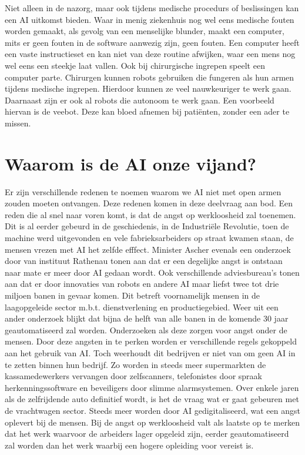 \documentclass{article}
\begin{document}
Niet alleen in de nazorg, maar ook tijdens medische procedurs of beslissingen kan een AI uitkomst bieden. Waar in menig ziekenhuis
nog wel eens medische fouten worden gemaakt, als gevolg van een menselijke blunder, maakt een computer, mits er geen fouten in de software
aanwezig zijn, geen fouten.\cite{computerziekenhuis} Een computer heeft een vaste instructieset en kan niet van deze routine afwijken, waar
een mens nog wel eens een steekje laat vallen. Ook bij chirurgische ingrepen speelt een computer parte.\cite{medischerobots} Chirurgen kunnen
robots gebruiken die fungeren als hun armen tijdens medische ingrepen. Hierdoor kunnen ze veel nauwkeuriger te werk gaan. Daarnaast zijn er
ook al robots die autonoom te werk gaan. Een voorbeeld hiervan is de veebot. Deze kan bloed afnemen bij patiënten, zonder een ader te missen.\cite{veebot}  







\section{Waarom is de AI onze vijand?}
Er zijn verschillende redenen te noemen waarom we AI niet met open armen zouden moeten ontvangen. Deze redenen komen in deze deelvraag aan bod.
Een reden die al snel naar voren komt, is dat de angst op werkloosheid zal toenemen. Dit is al eerder gebeurd in de geschiedenis, in de Industriële Revolutie, toen de machine werd uitgevonden en vele fabrieksarbeiders op straat kwamen staan, de mensen vrezen met AI het zelfde efffect. Minister Ascher\cite{vriendofvijand} evenals een onderzoek door van instituut Rathenau\cite{vriendofvijand}  tonen aan dat er een degelijke angst is ontstaan naar mate er meer door AI gedaan wordt. Ook verschillende adviesbureau's tonen aan dat er door innovaties van robots en andere AI maar liefst twee tot drie miljoen banen in gevaar komen. Dit betreft voornamelijk mensen in de laagopgeleide sector m.b.t. dienstverlening en productiegebied. Weer uit een ander onderzoek\cite{vriendofvijand} blijkt dat bijna de helft van alle banen in de komende 30 jaar geautomatiseerd zal worden. Onderzoeken als deze zorgen voor angst onder de mensen. Door deze angsten in te perken worden er verschillende regels gekoppeld aan het gebruik van AI. Toch weerhoudt dit bedrijven er niet van om geen AI in te zetten binnen hun bedrijf. Zo worden in steeds meer supermarkten de kassamedewerkers vervangen door zelfscanners, telefonistes door spraak herkenningssoftware en beveiligers door slimme alarmsystemen. Over enkele jaren als de zelfrijdende auto definitief wordt, is het de vraag wat er gaat gebeuren met de vrachtwagen sector. Steeds meer worden door AI gedigitaliseerd, wat een angst oplevert bij de mensen. Bij de angst op werkloosheid valt als laatste op te merken dat het werk waarvoor de arbeiders lager opgeleid zijn, eerder geautomatiseerd zal worden dan het werk waarbij een hogere opleiding voor vereist is. 
\end{document}
